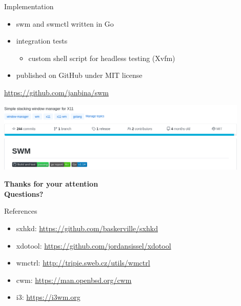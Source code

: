 \documentclass[aspectratio=43]{beamer}
\newcommand{\backupbegin}{
    \newcounter{finalframe}
    \setcounter{finalframe}{\value{framenumber}}
}
\newcommand{\backupend}{
    \setcounter{framenumber}{\value{finalframe}}
}
\begin{document}
    \begin{frame}{Implementation}
        \begin{itemize}
            \item swm and swmctl written in Go
            \item integration tests
            \begin{itemize}
                \item custom shell script for headless testing (Xvfm)
            \end{itemize}
            \item published on GitHub under MIT license
        \end{itemize}
        \vspace{1cm}
        \url{https://github.com/janbina/swm}
        \begin{center}
            \includegraphics[width=12cm]{img/github.png}
        \end{center}
    \end{frame}

    \backupbegin

    \begin{frame}
        \centering
        \Huge \textbf{Thanks for your attention} \\
        \vspace{30pt}
        \Huge \textbf{\textcolor{ctu}{Questions?}}
    \end{frame}

    \begin{frame}{References}
        \begin{itemize}
            \item sxhkd: \url{https://github.com/baskerville/sxhkd}
            \item xdotool: \url{https://github.com/jordansissel/xdotool}
            \item wmctrl: \url{http://tripie.sweb.cz/utils/wmctrl}
            \item cwm: \url{https://man.openbsd.org/cwm}
            \item i3: \url{https://i3wm.org}
        \end{itemize}
    \end{frame}

    \backupend
\end{document}
